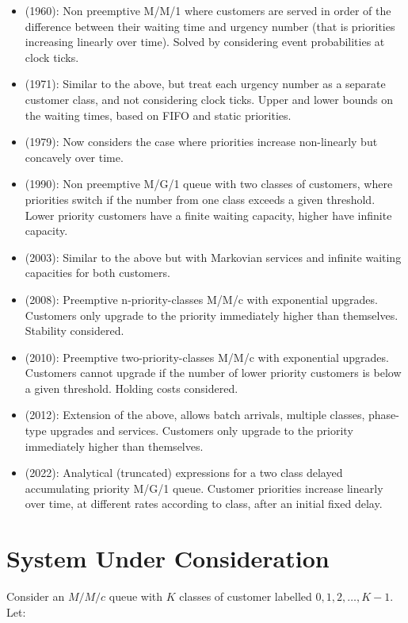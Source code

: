 \documentclass{article}
\begin{document}
\begin{itemize}
  \item \cite{jackson60} (1960): Non preemptive M/M/1 where customers
      are served in order of the difference between their waiting time
        and urgency number (that is priorities increasing linearly over
        time). Solved by considering event probabilities at clock ticks.
  \item \cite{holtzman71} (1971): Similar to the above, but treat each
      urgency number as a separate customer class, and not considering
        clock ticks. Upper and lower bounds on the waiting times, based
        on FIFO and static priorities.
  \item \cite{netterman79} (1979): Now considers the case where
      priorities increase non-linearly but concavely over time.
  \item \cite{fratini90} (1990): Non preemptive M/G/1 queue with two
      classes of customers, where priorities switch if the number from
        one class exceeds a given threshold. Lower priority customers
        have a finite waiting capacity, higher have infinite capacity.
  \item \cite{knessl03} (2003): Similar to the above but with Markovian
      services and infinite waiting capacities for both customers.
  \item \cite{xie08} (2008): Preemptive n-priority-classes M/M/c with
      exponential upgrades. Customers only upgrade to the priority
        immediately higher than themselves. Stability considered.
  \item \cite{down10} (2010): Preemptive two-priority-classes M/M/c with
      exponential upgrades. Customers cannot upgrade if the number of
        lower priority customers is below a given threshold. Holding
        costs considered.
  \item \cite{he12} (2012): Extension of the above, allows batch
      arrivals, multiple classes, phase-type upgrades and services.
        Customers only upgrade to the priority immediately higher than
        themselves.
  \item \cite{bilodeau22} (2022): Analytical (truncated) expressions for
      a two class delayed accumulating priority M/G/1 queue. Customer
        priorities increase linearly over time, at different rates
        according to class, after an initial fixed delay.
\end{itemize}



\section{System Under Consideration}\label{sec:system}
Consider an $M/M/c$ queue with $K$ classes of customer labelled
$0, 1, 2, \dots, K-1$.
Let:
\end{document}
